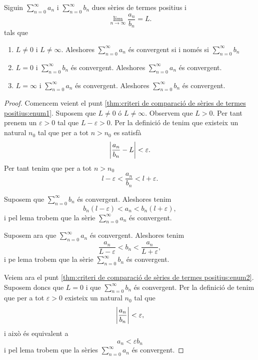 \documentclass[../Apunts.tex]{subfiles}
\begin{document}
	\begin{theorem}
		\label{thm:criteri de comparació de sèries de termes positius}
		Siguin \(\sum_{n=0}^{\infty}a_{n}\) i \(\sum_{n=0}^{\infty}b_{n}\) dues sèries de termes positius i
		\[\lim_{n\to\infty}\frac{a_{n}}{b_{n}}=L.\]
		tals que
		\begin{enumerate}
			\item\label{thm:criteri de comparació de sèries de termes positius:enum1} \(L\neq0\) i \(L\neq\infty\). Aleshores \(\sum_{n=0}^{\infty}a_{n}\) és convergent si i només si \(\sum_{n=0}^{\infty}b_{n}\)
			\item\label{thm:criteri de comparació de sèries de termes positius:enum2} \(L=0\) i \(\sum_{n=0}^{\infty}b_{n}\) és convergent. Aleshores \(\sum_{n=0}^{\infty}a_{n}\) és convergent.
			\item\label{thm:criteri de comparació de sèries de termes positius:enum3} \(L=\infty\) i \(\sum_{n=0}^{\infty}a_{n}\) és convergent. Aleshores \(\sum_{n=0}^{\infty}b_{n}\) és convergent.
		\end{enumerate}
		\begin{proof}
			Comencem veient el punt \eqref{thm:criteri de comparació de sèries de termes positius:enum1}. Suposem que \(L\neq0\) ó \(L\neq\infty\). Observem que \(L>0\). Per tant prenem un \(\varepsilon>0\) tal que \(L-\varepsilon>0\). Per la definició de  tenim que existeix un natural \(n_{0}\) tal que per a tot \(n>n_{0}\) es satisfà
			\[\abs{\frac{a_{n}}{b_{n}}-L}<\varepsilon.\]
			Per tant tenim que per a tot \(n>n_{0}\)
			\[l-\varepsilon<\frac{a_{n}}{b_{n}}<l+\varepsilon.\]
			
			Suposem que \(\sum_{n=0}^{\infty}b_{n}\) és convergent. Aleshores tenim
			\[b_{n}(l-\varepsilon)<a_{n}<b_{n}(l+\varepsilon),\]
			i pel lema  trobem que la sèrie \(\sum_{n=0}^{\infty}a_{n}\) és convergent.
			
			Suposem ara que \(\sum_{n=0}^{\infty}a_{n}\) és convergent. Aleshores tenim
			\[\frac{a_{n}}{L-\varepsilon}<b_{n}<\frac{a_{n}}{L+\varepsilon},\]
			i pe lema  trobem que la sèrie \(\sum_{n=0}^{\infty}b_{n}\) és convergent.
			
			Veiem ara el punt \eqref{thm:criteri de comparació de sèries de termes positius:enum2}. Suposem doncs que \(L=0\) i que \(\sum_{n=0}^{\infty}b_{n}\) és convergent. Per la definició de  tenim que per a tot \(\varepsilon>0\) existeix un natural \(n_{0}\) tal que
			\[\abs{\frac{a_{n}}{b_{n}}}<\varepsilon,\]
			i això és equivalent a
			\[a_{n}<\varepsilon b_{n}\]
			i pel lema  trobem que la sèries \(\sum_{n=0}^{\infty}a_{n}\) és convergent.
			

\end{proof}
\end{theorem}
\end{document}
